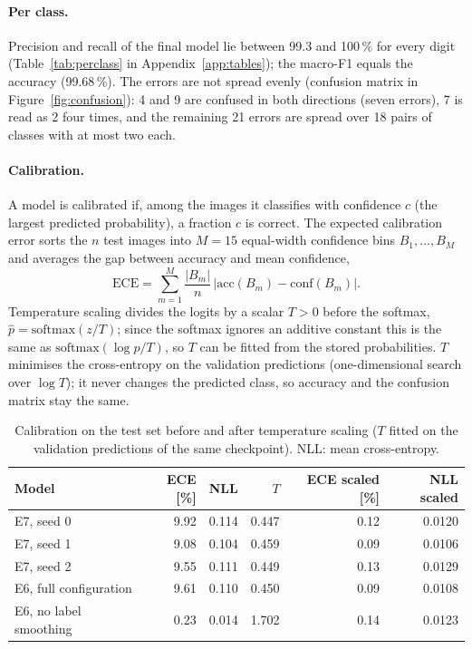 \documentclass[11pt,a4paper]{article}
\newcommand{\1}{\mathbf{1}}
\begin{document}
\paragraph{Per class.} Precision and recall of the final model lie between 99.3 and 100\,\% for
every digit (Table~\ref{tab:perclass} in Appendix~\ref{app:tables}); the macro-F1 equals the accuracy (99.68\,\%). The
errors are not spread evenly (confusion matrix in Figure~\ref{fig:confusion}): 4 and 9 are confused in both
directions (seven errors), 7 is read as 2 four times, and the remaining 21 errors are spread
over 18 pairs of classes with at most two each.

\paragraph{Calibration.} A model is calibrated if, among the images it classifies with
confidence $c$ (the largest predicted probability), a fraction $c$ is correct. The expected
calibration error sorts the $n$ test images into $M = 15$ equal-width confidence bins
$B_1, \dots, B_M$ and averages the gap between accuracy and mean confidence,
\[
  \mathrm{ECE} = \sum_{m=1}^{M} \frac{|B_m|}{n}\,\bigl|\mathrm{acc}(B_m) - \mathrm{conf}(B_m)\bigr|.
\]
Temperature scaling divides the logits by a scalar $T > 0$ before the softmax,
$\hat p = \mathrm{softmax}(z / T)$; since the softmax ignores an additive constant this is the
same as $\mathrm{softmax}(\log p / T)$, so $T$ can be fitted from the stored probabilities. $T$
minimises the cross-entropy on the validation predictions (one-dimensional search over
$\log T$); it never changes the predicted class, so accuracy and the confusion matrix stay the
same.

\begin{table}[t]
  \centering
  \small
  \caption{Calibration on the test set before and after temperature scaling ($T$ fitted on the
    validation predictions of the same checkpoint). NLL: mean cross-entropy.}
  \label{tab:calibration}
  \begin{tabular}{lrrrrr}
    \toprule
    Model & ECE [\%] & NLL & $T$ & ECE scaled [\%] & NLL scaled \\
    \midrule
    E7, seed 0 & 9.92 & 0.114 & 0.447 & 0.12 & 0.0120 \\
    E7, seed 1 & 9.08 & 0.104 & 0.459 & 0.09 & 0.0106 \\
    E7, seed 2 & 9.55 & 0.111 & 0.449 & 0.13 & 0.0129 \\
    E6, full configuration & 9.61 & 0.110 & 0.450 & 0.09 & 0.0108 \\
    E6, no label smoothing & 0.23 & 0.014 & 1.702 & 0.14 & 0.0123 \\
    \bottomrule
  \end{tabular}
\end{table}
\end{document}
